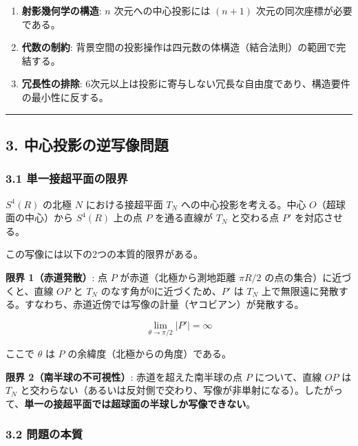 \documentclass[a4paper,11pt]{ltjsarticle}
\providecommand{\tightlist}{\setlength{\itemsep}{0pt}\setlength{\parskip}{0pt}}
\begin{document}
\begin{enumerate}
\def\labelenumi{\arabic{enumi}.}
\tightlist
\item
  \textbf{射影幾何学の構造}: \(n\) 次元への中心投影には \((n+1)\)
  次元の同次座標が必要である。
\item
  \textbf{代数の制約}:
  背景空間の投影操作は四元数の体構造（結合法則）の範囲で完結する。
\item
  \textbf{冗長性の排除}:
  6次元以上は投影に寄与しない冗長な自由度であり、構造要件の最小性に反する。
\end{enumerate}

\begin{center}\rule{0.5\linewidth}{0.5pt}\end{center}

\subsection{3.
中心投影の逆写像問題}\label{ux4e2dux5fc3ux6295ux5f71ux306eux9006ux5199ux50cfux554fux984c}

\subsubsection{3.1
単一接超平面の限界}\label{ux5358ux4e00ux63a5ux8d85ux5e73ux9762ux306eux9650ux754c}

\(S^4(R)\) の北極 \(N\) における接超平面 \(T_N\)
への中心投影を考える。中心 \(O\)（超球面の中心）から \(S^4(R)\) 上の点
\(P\) を通る直線が \(T_N\) と交わる点 \(P'\) を対応させる。

この写像には以下の2つの本質的限界がある。

\textbf{限界 1（赤道発散）}: 点 \(P\) が赤道（北極から測地距離
\(\pi R / 2\) の点の集合）に近づくと、直線 \(OP\) と \(T_N\)
のなす角が0に近づくため、\(P'\) は \(T_N\)
上で無限遠に発散する。すなわち、赤道近傍では写像の計量（ヤコビアン）が発散する。

\[\lim_{\theta \to \pi/2} |P'| = \infty\]

ここで \(\theta\) は \(P\) の余緯度（北極からの角度）である。

\textbf{限界 2（南半球の不可視性）}: 赤道を超えた南半球の点 \(P\)
について、直線 \(OP\) は \(T_N\)
と交わらない（あるいは反対側で交わり、写像が非単射になる）。したがって、\textbf{単一の接超平面では超球面の半球しか写像できない}。

\subsubsection{3.2 問題の本質}\label{ux554fux984cux306eux672cux8cea}
\end{document}
